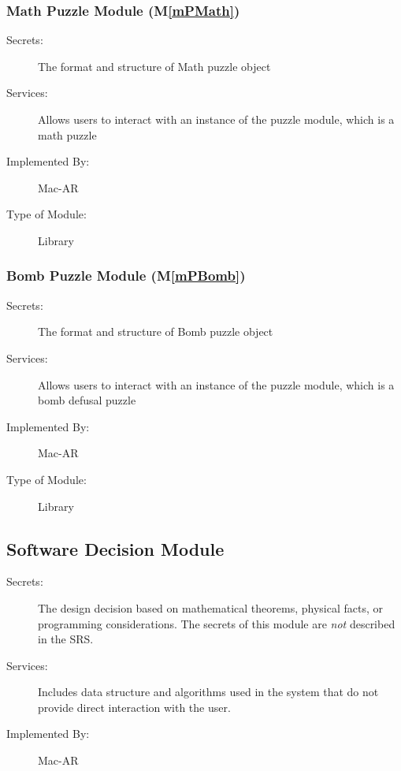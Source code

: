 \documentclass[12pt, titlepage]{article}
\newcommand{\mref}[1]{M\ref{#1}}
\begin{document}
\subsubsection{Math Puzzle Module (\mref{mPMath})}
\begin{description}
\item[Secrets:]The format and structure of Math puzzle object
\item[Services:]Allows users to interact with an instance of the puzzle module, which is a math puzzle
\item[Implemented By:] Mac-AR
\item[Type of Module:] Library
\end{description}

\subsubsection{Bomb Puzzle Module (\mref{mPBomb})}
\begin{description}
\item[Secrets:]The format and structure of Bomb puzzle object
\item[Services:]Allows users to interact with an instance of the puzzle module, which is a bomb defusal puzzle
\item[Implemented By:] Mac-AR
\item[Type of Module:] Library
\end{description}

\subsection{Software Decision Module}

\begin{description}
\item[Secrets:] The design decision based on mathematical theorems, physical
  facts, or programming considerations. The secrets of this module are
  \emph{not} described in the SRS.
\item[Services:] Includes data structure and algorithms used in the system that
  do not provide direct interaction with the user. 
\item[Implemented By:] Mac-AR
\end{description}
\end{document}
